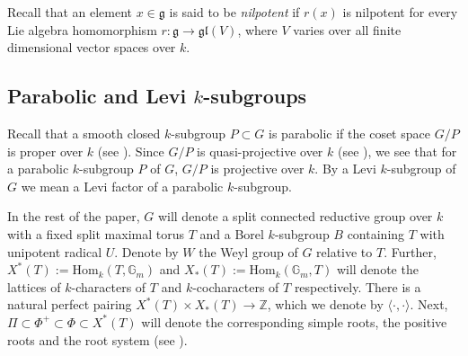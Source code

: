 \documentclass{amsart}
\newcommand{\gm}{\mathbb{G}_{m}}
\theoremstyle{plain}
\theoremstyle{definition}
\theoremstyle{remark}
\begin{document}
Recall that an element $x\in\mathfrak{g}$ is said to be \emph{nilpotent} if $r(x)$ is nilpotent for every Lie algebra homomorphism $r:\mathfrak{g}\rightarrow \mathfrak{g}\mathfrak{l}(V)$, where $V$ varies over all finite dimensional vector spaces over $k$.

\subsection{Parabolic and Levi $k$-subgroups}\label{parabolic-levi}

Recall that a smooth closed $k$-subgroup $P\subset G$ is parabolic
if the coset space $G/P$ is proper over $k$ (see \cite[Definition 17.15]{Mil1}). Since $G/P$ is quasi-projective over $k$ (see \cite[Theorem 8.44]{Mil1}), we see that for a parabolic $k$-subgroup $P$ of $G$, $G/P$ is projective over $k$.
By a Levi $k$-subgroup of $G$ we mean a Levi factor of a parabolic $k$-subgroup.

In the rest of the paper, $G$ will denote a split connected reductive group over $k$ with a fixed split maximal torus $T$ and a Borel $k$-subgroup $B$ containing $T$ with unipotent radical $U$. Denote by $W$ the Weyl group of $G$ relative to $T$. Further, $X^{*}(T):=\text{Hom}_{k}(T,\gm)$ and $X_{*}(T):=\text{Hom}_{k}(\gm,T)$ will denote the lattices of $k$-characters of $T$ and $k$-cocharacters of $T$ respectively. There is a natural perfect pairing $X^{*}(T)\times X_{*}(T)\rightarrow\mathbb{Z}$, which we denote by $\langle\cdot,\cdot\rangle$. Next, $\Pi\subset\Phi^{+}\subset\Phi\subset X^{*}(T)$ will denote the corresponding simple roots, the positive roots and the root system (see \cite[Chapter 21]{Mil1}).
\end{document}
